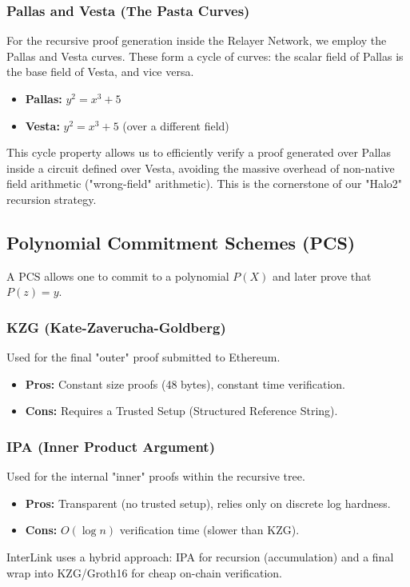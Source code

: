 \documentclass[11pt,a4paper]{article}
\begin{document}
\subsubsection{Pallas and Vesta (The Pasta Curves)}
For the recursive proof generation inside the Relayer Network, we employ the Pallas and Vesta curves. These form a cycle of curves: the scalar field of Pallas is the base field of Vesta, and vice versa.
\begin{itemize}
    \item \textbf{Pallas:} $y^2 = x^3 + 5$
    \item \textbf{Vesta:} $y^2 = x^3 + 5$ (over a different field)
\end{itemize}
This cycle property allows us to efficiently verify a proof generated over Pallas inside a circuit defined over Vesta, avoiding the massive overhead of non-native field arithmetic ("wrong-field" arithmetic). This is the cornerstone of our "Halo2" recursion strategy.

\subsection{Polynomial Commitment Schemes (PCS)}
A PCS allows one to commit to a polynomial $P(X)$ and later prove that $P(z) = y$.

\subsubsection{KZG (Kate-Zaverucha-Goldberg)}
Used for the final "outer" proof submitted to Ethereum.
\begin{itemize}
    \item \textbf{Pros:} Constant size proofs (48 bytes), constant time verification.
    \item \textbf{Cons:} Requires a Trusted Setup (Structured Reference String).
\end{itemize}

\subsubsection{IPA (Inner Product Argument)}
Used for the internal "inner" proofs within the recursive tree.
\begin{itemize}
    \item \textbf{Pros:} Transparent (no trusted setup), relies only on discrete log hardness.
    \item \textbf{Cons:} $O(\log n)$ verification time (slower than KZG).
\end{itemize}
InterLink uses a hybrid approach: IPA for recursion (accumulation) and a final wrap into KZG/Groth16 for cheap on-chain verification.
\end{document}
